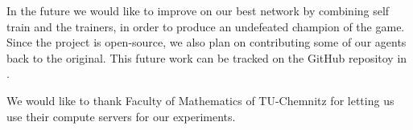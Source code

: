 \documentclass[11pt,a4paper]{scrartcl}
\begin{document}
In the future we would like to improve on our best network by combining self train and the trainers, in order to produce an undefeated champion of the game. Since the project is open-source, we also plan on contributing some of our agents back to the original.
This future work can be tracked on the GitHub repositoy in \cite{github_repo}.

We would like to thank Faculty of Mathematics of TU-Chemnitz for letting us use their compute servers for our experiments.

{}

\end{document}
